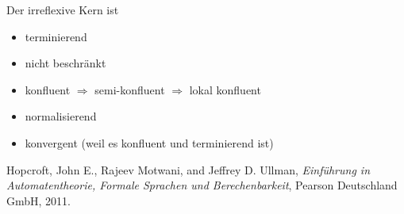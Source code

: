 \documentclass[
  a4paper,
  11pt,
]{scrartcl}
\begin{document}
Der irreflexive Kern ist
\begin{itemize}
  \item terminierend
  \item nicht beschränkt
  \item konfluent $\Rightarrow$ semi-konfluent $\Rightarrow$ lokal konfluent
  \item normalisierend
  \item konvergent (weil es konfluent und terminierend ist)
\end{itemize}

\begin{thebibliography}{9}

  Hopcroft, John E., Rajeev Motwani, and Jeffrey D. Ullman,
  \emph{Einführung in Automatentheorie, Formale Sprachen und Berechenbarkeit},
  Pearson Deutschland GmbH,
  2011.

\end{thebibliography}
\end{document}
